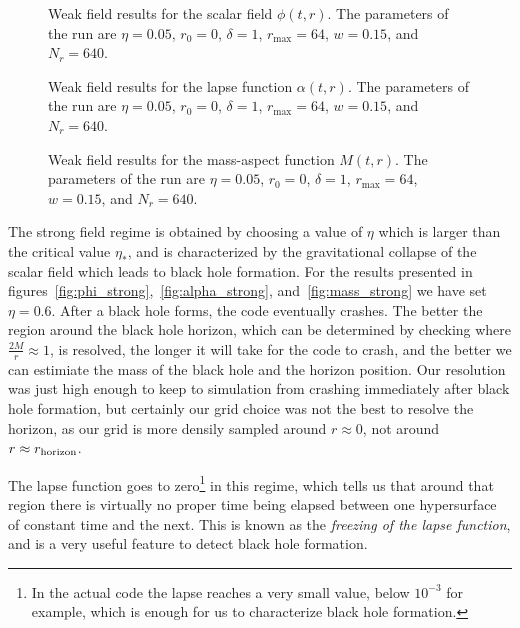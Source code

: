 \documentclass[a4paper,11pt]{article}
\renewcommand{\a}{\alpha}
\begin{document}
\begin{figure}[H]
  \centering
  
  \caption[Weak field results for the scalar field $\phi(t,r)$.]{Weak field results for the scalar field $\phi(t,r)$. The parameters of the run are $\eta=0.05$, $r_{0}=0$, $\delta=1$, $r_{\max}=64$, $w=0.15$, and $N_{r}=640$.}
  \label{fig:phi_weak}
\end{figure}

\begin{figure}[H]
  \centering
  
  \caption[Weak field results for the lapse function $\a(t,r)$.]{Weak field results for the lapse function $\a(t,r)$. The parameters of the run are $\eta=0.05$, $r_{0}=0$, $\delta=1$, $r_{\max}=64$, $w=0.15$, and $N_{r}=640$.}
  \label{fig:alpha_weak}
\end{figure}

\begin{figure}[H]
  \centering
  
  \caption[Weak field results for the mass-aspect function $M(t,r)$.]{Weak field results for the mass-aspect function $M(t,r)$. The parameters of the run are $\eta=0.05$, $r_{0}=0$, $\delta=1$, $r_{\max}=64$, $w=0.15$, and $N_{r}=640$.}
  \label{fig:mass_weak}
\end{figure}

The strong field regime is obtained by choosing a value of $\eta$ which is larger than the critical value $\eta_{*}$, and is characterized by the gravitational collapse of the scalar field which leads to black hole formation. For the results presented in figures~\ref{fig:phi_strong},~\ref{fig:alpha_strong}, and~\ref{fig:mass_strong} we have set $\eta=0.6$. After a black hole forms, the code eventually crashes. The better the region around the black hole horizon, which can be determined by checking where $\frac{2M}{r}\approx1$, is resolved, the longer it will take for the code to crash, and the better we can estimiate the mass of the black hole and the horizon position. Our resolution was just high enough to keep to simulation from crashing immediately after black hole formation, but certainly our grid choice was not the best to resolve the horizon, as our grid is more densily sampled around $r\approx0$, not around $r\approx r_{\rm horizon}$.

The lapse function goes to zero\footnote{In the actual code the lapse reaches a very small value, below $10^{-3}$ for example, which is enough for us to characterize black hole formation.} in this regime, which tells us that around that region there is virtually no proper time being elapsed between one hypersurface of constant time and the next. This is known as the \emph{freezing of the lapse function}, and is a very useful feature to detect black hole formation.
\end{document}
